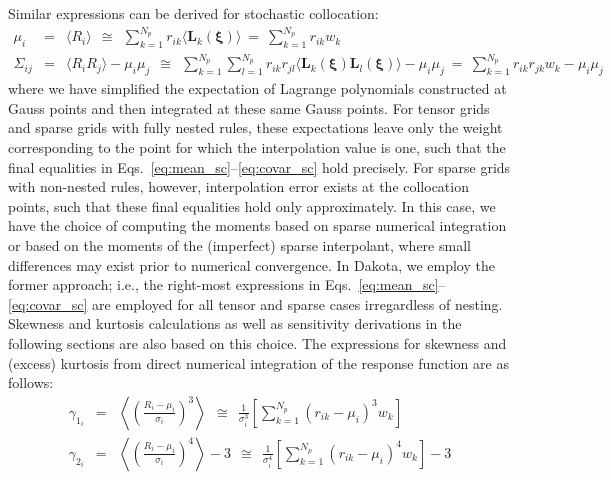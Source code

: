 Similar expressions can be derived for stochastic collocation:
\begin{eqnarray}
\mu_i      &=& \langle R_i \rangle ~~\cong~~ \sum_{k=1}^{N_p} r_{ik} \langle 
\boldsymbol{L}_k(\boldsymbol{\xi}) \rangle ~=~ \sum_{k=1}^{N_p} r_{ik} w_k 
\label{eq:mean_sc} \\
\Sigma_{ij} &=& \langle R_i R_j \rangle - \mu_i \mu_j
~~\cong~~ \sum_{k=1}^{N_p} \sum_{l=1}^{N_p} r_{ik} r_{jl} \langle
\boldsymbol{L}_k(\boldsymbol{\xi}) \boldsymbol{L}_l(\boldsymbol{\xi}) \rangle
- \mu_i \mu_j ~=~ \sum_{k=1}^{N_p} r_{ik} r_{jk} w_k - \mu_i \mu_j~~~~~~~~~ \label{eq:covar_sc} 
\end{eqnarray}
where we have simplified the expectation of Lagrange polynomials
constructed at Gauss points and then integrated at these same Gauss
points.  For tensor grids and sparse grids with fully nested rules,
these expectations leave only the weight corresponding to the point
for which the interpolation value is one, such that the final
equalities in Eqs.~\ref{eq:mean_sc}--\ref{eq:covar_sc} hold precisely.
For sparse grids with non-nested rules, however, interpolation error
exists at the collocation points, such that these final equalities
hold only approximately.  In this case, we have the choice of
computing the moments based on sparse numerical integration or based
on the moments of the (imperfect) sparse interpolant, where small
differences may exist prior to numerical convergence.  In Dakota, we
employ the former approach; i.e., the right-most expressions in
Eqs.~\ref{eq:mean_sc}--\ref{eq:covar_sc} are employed for all tensor
and sparse cases irregardless of nesting.  Skewness and kurtosis
calculations as well as sensitivity derivations in the following
sections are also based on this choice.
The expressions for skewness and (excess) kurtosis from direct numerical 
integration of the response function are as follows:
\begin{eqnarray}
\gamma_{1_i} &=& \left\langle \left(\frac{R_i - \mu_i}{\sigma_i}\right)^3 \right\rangle
~~\cong~~ \frac{1}{\sigma_i^3} \left[ \sum_{k=1}^{N_p} (r_{ik}-\mu_i)^3 w_k \right] \label{eq:skewness} \\
\gamma_{2_i} &=& \left\langle \left(\frac{R_i - \mu_i}{\sigma_i}\right)^4 \right\rangle - 3 
~~\cong~~ \frac{1}{\sigma_i^4} \left[ \sum_{k=1}^{N_p} (r_{ik}-\mu_i)^4 w_k \right] - 3\label{eq:kurtosis} 
\end{eqnarray}


